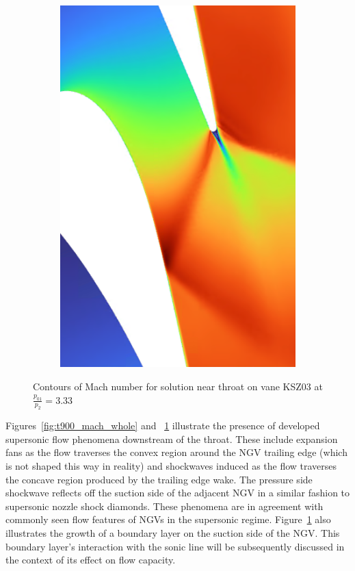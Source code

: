 \documentclass[a4paper, 11pt, oneside]{report}
\begin{document}
\begin{figure}[H]
\begin{subfigure}{.15\textwidth}
	\end{subfigure}
	\hspace{0.05\textwidth}
	\begin{subfigure}{.45\textwidth}
		\centering
		\includegraphics[width=\linewidth]{figs/t900_mach_throat.png}
	\end{subfigure}
	\caption{Contours of Mach number for solution near throat on vane KSZ03 at $\frac{p_{01}}{p_2}=3.33$}
	\label{fig:t900_mach_throat}
\end{figure}

Figures~\ref{fig:t900_mach_whole} and ~\ref{fig:t900_mach_throat} illustrate the presence of developed supersonic flow phenomena downstream of the throat. These include expansion fans as the flow traverses the convex region around the NGV trailing edge (which is not shaped this way in reality) and shockwaves induced as the flow traverses the concave region produced by the trailing edge wake. The pressure side shockwave reflects off the suction side of the adjacent NGV in a similar fashion to supersonic nozzle shock diamonds. These phenomena are in agreement with commonly seen flow features of NGVs in the supersonic regime. Figure~\ref{fig:t900_mach_throat} also illustrates the growth of a boundary layer on the suction side of the NGV. This boundary layer's interaction with the sonic line will be subsequently discussed in the context of its effect on flow capacity.
\end{document}

